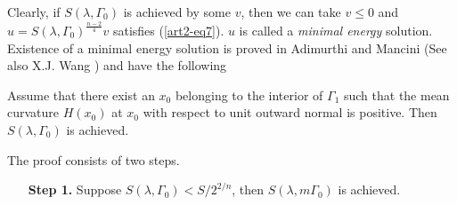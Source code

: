 Clearly, if $S(\lambda, \Gamma_{0})$ is achieved by some $v$, then we can take $v\leq 0$ and $u=S(\lambda, \Gamma_{0})^{\frac{n-2}{4}}v$ satisfies (\ref{art2-eq7}). $u$ is called a \textit{minimal energy} solution. Existence of a minimal energy solution is proved in Adimurthi and Mancini \cite{art2-key1} (See also X.J. Wang \cite{art2-key22}) and have the following 

\begin{theorem}
Assume that there exist an $x_{0}$ belonging to the interior of $\Gamma_{1}$ such that the mean curvature $H(x_{0})$ at $x_{0}$ with respect to unit outward normal is positive. Then $S(\lambda, \Gamma_{0})$ is achieved.
\end{theorem}

\begin{sketch of the proof}
The proof consists of two steps.
\begin{itemize}
\item[{\rm\bf Step 1.}] Suppose $S(\lambda, \Gamma_{0}) < S/2^{2/n}$, then $S(\lambda,m \Gamma_{0})$ is achieved.


\end{itemize}
\end{sketch of the proof}
